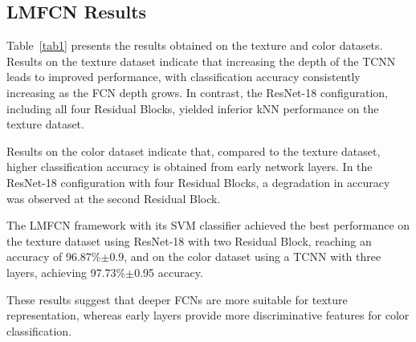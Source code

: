 \documentclass[conference]{IEEEtran}
\begin{document}
\subsection{LMFCN Results}

Table~\ref{tab1} presents the results obtained on the texture and color datasets. Results on the texture dataset indicate that increasing the depth of the TCNN leads to improved performance, with classification accuracy consistently increasing as the FCN depth grows. In contrast, the ResNet-18 configuration, including all four Residual Blocks, yielded inferior kNN performance on the texture dataset. 

Results on the color dataset indicate that, compared to the texture dataset, higher classification accuracy is obtained from early network layers. In the ResNet-18 configuration with four Residual Blocks, a degradation in accuracy was observed at the second Residual Block. 

The LMFCN framework with its SVM classifier achieved the best performance on the texture dataset using ResNet-18 with two Residual Block, reaching an accuracy of 96.87\%$\pm$0.9, and on the color dataset using a TCNN with three layers, achieving 97.73\%$\pm$0.95 accuracy.

These results suggest that deeper FCNs are more suitable for texture representation, whereas early layers provide more discriminative features for color classification.


\end{document}
